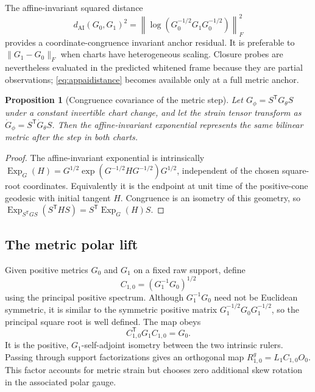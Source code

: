 \documentclass[10pt,twocolumn]{article}
\newtheorem{proposition}[theorem]{Proposition}
\theoremstyle{definition}
\theoremstyle{remark}
\newcommand{\Exp}{\operatorname{Exp}}
\begin{document}
The affine-invariant squared distance
\begin{equation}
 d_{\mathrm{AI}}(G_0,G_1)^2
 =\left\|\log\!\left(G_0^{-1/2}G_1G_0^{-1/2}\right)\right\|_F^2
 \label{eq:appaidistance}
\end{equation}
provides a coordinate-congruence invariant anchor residual.  It is preferable
to $\|G_1-G_0\|_F$ when charts have heterogeneous scaling.  Closure probes are
nevertheless evaluated in the predicted whitened frame because they are
partial observations; \eqref{eq:appaidistance} becomes available only at a
full metric anchor.

\begin{proposition}[Congruence covariance of the metric step]
\label{prop:congruencestep}
Let $G_\phi=S^{\mathsf T}G_\theta S$ under a constant invertible chart change,
and let the strain tensor transform as
$\dot G_\phi=S^{\mathsf T}\dot G_\theta S$.  Then the affine-invariant
exponential represents the same bilinear metric after the step in both
charts.
\end{proposition}
\begin{proof}
The affine-invariant exponential is intrinsically
$\Exp_G(H)=G^{1/2}\exp(G^{-1/2}HG^{-1/2})G^{1/2}$, independent of the chosen
square-root coordinates.  Equivalently it is the endpoint at unit time of
the positive-cone geodesic with initial tangent $H$.  Congruence is an
isometry of this geometry, so
$\Exp_{S^{\mathsf T}GS}(S^{\mathsf T}HS)
=S^{\mathsf T}\Exp_G(H)S$.
\end{proof}

\subsection{The metric polar lift}

Given positive metrics $G_0$ and $G_1$ on a fixed raw support, define
\begin{equation}
 C_{1,0}=(G_1^{-1}G_0)^{1/2}
 \label{eq:appC}
\end{equation}
using the principal positive spectrum.  Although $G_1^{-1}G_0$ need not be
Euclidean symmetric, it is similar to the symmetric positive matrix
$G_1^{-1/2}G_0G_1^{-1/2}$, so the principal square root is well defined.
The map obeys
\begin{equation}
 C_{1,0}^{\mathsf T}G_1C_{1,0}=G_0 .
 \label{eq:appCisometry}
\end{equation}
It is the positive, $G_1$-self-adjoint isometry between the two intrinsic
rulers.  Passing through support factorizations gives an orthogonal map
$R^g_{1,0}=L_1C_{1,0}O_0$.  This factor accounts for metric strain but chooses
zero additional skew rotation in the associated polar gauge.
\end{document}
